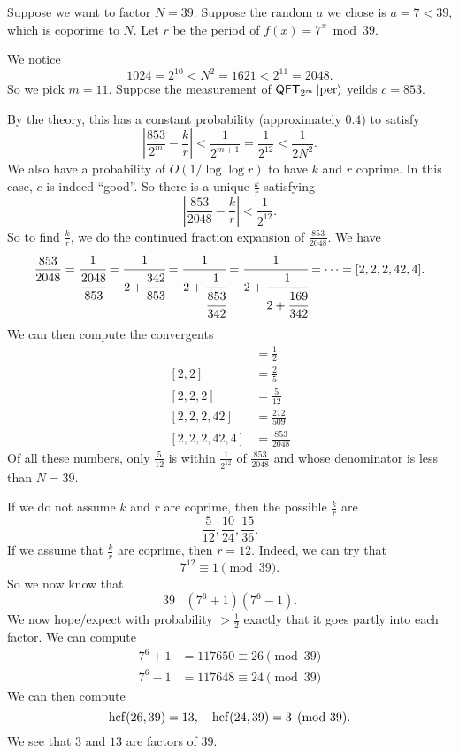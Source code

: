 \begin{eg}
  Suppose we want to factor $N = 39$. Suppose the random $a$ we chose is $a = 7 < 39$, which is coporime to $N$. Let $r$ be the period of $f(x) = 7^x \bmod 39$.

  We notice
  \[
    1024 = 2^{10} < N^2 = 1621 < 2^{11} = 2048.
  \]
  So we pick $m = 11$. Suppose the measurement of $\mathsf{QFT}_{2^m}\left\lvert \mathrm{per}\right\rangle$ yeilds $c = 853$.

  By the theory, this has a constant probability (approximately $0.4$) to satisfy
  \[
    \left|\frac{853}{2^m} - \frac{k}{r}\right| < \frac{1}{2^{m + 1}} = \frac{1}{2^{12}} < \frac{1}{2N^2}.
  \]
  We also have a probability of $O(1/\log \log r)$ to have $k$ and $r$ coprime. In this case, $c$ is indeed ``good''. So there is a unique $\frac{k}{r}$ satisfying
  \[
    \left|\frac{853}{2048} - \frac{k}{r}\right| < \frac{1}{2^{12}}.
  \]
  So to find $\frac{k}{r}$, we do the continued fraction expansion of $\frac{853}{2048}$. We have
  \[
    \frac{853}{2048} = \cfrac{1}{\cfrac{2048}{853}} = \cfrac{1}{2 + \cfrac{342}{853}} = \cfrac{1}{2 + \cfrac{1}{\cfrac{853}{342}}} = \cfrac{1}{2 + \cfrac{1}{2 + \cfrac{169}{342}}} = \cdots = [2, 2, 2, 42, 4].
  \]
  We can then compute the convergents
  \begin{align*}
    [2] &= \frac{1}{2}\\
    [2, 2] &= \frac{2}{5}\\
    [2, 2, 2] &= \frac{5}{12}\\
    [2, 2, 2, 42] &= \frac{212}{509}\\
    [2, 2, 2, 42, 4] &= \frac{853}{2048}
  \end{align*}
  Of all these numbers, only $\frac{5}{12}$ is within $\frac{1}{2^{12}}$ of $\frac{853}{2048}$ and whose denominator is less than $N = 39$.

  If we do not assume $k$ and $r$ are coprime, then the possible $\frac{k}{r}$ are
  \[
    \frac{5}{12}, \frac{10}{24}, \frac{15}{36}.
  \]
  If we assume that $\frac{k}{r}$ are coprime, then $r = 12$. Indeed, we can try that
  \[
    7^{12} \equiv 1 \pmod {39}.
  \]
  So we now know that
  \[
    39 \mid (7^6 + 1)(7^6 - 1).
  \]
  We now hope/expect with probability $>\frac{1}{2}$ exactly that it goes partly into each factor. We can compute
  \begin{align*}
    7^6 + 1 &= 117650 \equiv 26 \pmod {39}\\
    7^6 - 1 &= 117648 \equiv 24 \pmod {39}
  \end{align*}
  We can then compute
  \[
    \operatorname{hcf}(26, 39) = 13,\quad \operatorname{hcf}(24, 39) = 3 \pmod {39}.
  \]
  We see that $3$ and $13$ are factors of $39$.
\end{eg}

